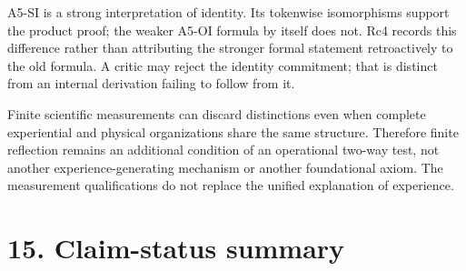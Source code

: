 \documentclass[
  11pt,
  a4paper,
]{article}
\begin{document}
A5-SI is a strong interpretation of identity. Its tokenwise isomorphisms
support the product proof; the weaker A5-OI formula by itself does not.
Rc4 records this difference rather than attributing the stronger formal
statement retroactively to the old formula. A critic may reject the
identity commitment; that is distinct from an internal derivation
failing to follow from it.

Finite scientific measurements can discard distinctions even when
complete experiential and physical organizations share the same
structure. Therefore finite reflection remains an additional condition
of an operational two-way test, not another experience-generating
mechanism or another foundational axiom. The measurement qualifications
do not replace the unified explanation of experience.

\hypertarget{claim-status-summary}{%
\section{15. Claim-status summary}\label{claim-status-summary}}
\end{document}
